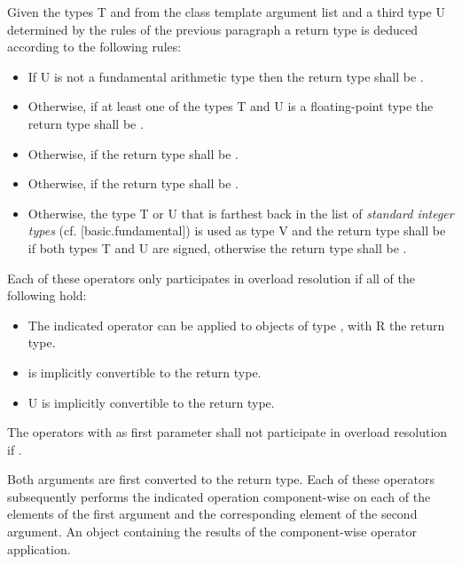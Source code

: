 \begin{wgText}
\begin{itemdescr}
    \pnum\remarks Given the types \type T and  from the class template argument list and a third type \type U determined by the rules of the previous paragraph a return type is deduced according to the following rules:
    \begin{itemize}
      \item If \type U is not a fundamental arithmetic type then the return type shall be \datapar{}.
      \item Otherwise, if at least one of the  types \type T and \type U is a floating-point type
        the return type shall be \datapar{}.
      \item Otherwise, if  the return type shall be \datapar{}.
      \item Otherwise, if  the return type shall be \datapar{}.
      \item Otherwise, the type \type T or \type U that is farthest back in the list of \textit{standard integer types} (cf. [basic.fundamental]) is used as type \type V and
        the return type shall be \datapar{} if both types \type T and \type U are signed, otherwise the return type shall be \datapar{}.
    \end{itemize}

    \pnum\remarks Each of these operators only participates in overload resolution if all of the following hold:
    \begin{itemize}
      \item The indicated operator can be applied to objects of type , with \type R the return type.
      \item \datapar{} is implicitly convertible to the return type.
      \item \type U is implicitly convertible to the return type.
    \end{itemize}

    \pnum\remarks The operators with  as first parameter shall not participate in overload resolution if .

    \pnum\effects Both arguments are first converted to the return type.
      Each of these operators subsequently performs the indicated operation component-wise on each of the elements of the first argument and the corresponding element of the second argument.
    \pnum\returns An object containing the results of the component-wise operator application.
  \end{itemdescr}


\end{wgText}
